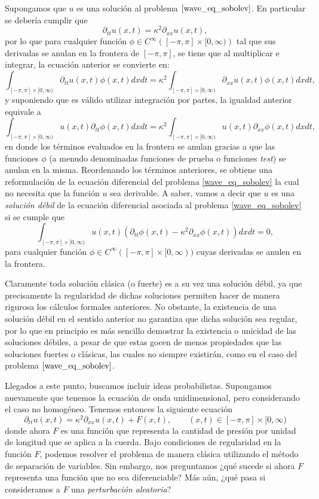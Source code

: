 \documentclass[letterpaper,twoside,12pt]{book}
\newcommand{\1}{\mathds{1}}
\theoremstyle{definition}
\theoremstyle{definition}
\theoremstyle{remark}
\theoremstyle{definition}
\theoremstyle{definition}
\theoremstyle{definition}
\theoremstyle{definition}
\theoremstyle{definition}
\begin{document}
Supongamos que $u$ es una solución al problema $\eqref{wave_eq_sobolev}$. En particular se debería cumplir que 
\[
\partial_{tt}u(x,t)=\kappa^2\partial_{xx}u(x,t),
\]
por lo que para cualquier función $\phi\in C^{\infty}\left([-\pi,\pi]\times [0,\infty)\right)$ tal que sus derivadas se anulan en la frontera de $[-\pi, \pi]$, se tiene que al multiplicar e integrar, la ecuación anterior se convierte en:
\[
    \int_{[-\pi,\pi]\times [0,\infty)}\partial_{tt}u(x,t)\phi(x,t)dx dt=\kappa^2\int_{[-\pi,\pi]\times [0,\infty)}\partial_{xx}u(x,t)\phi(x,t)dx dt,
\]
y suponiendo que es válido utilizar integración por partes, la igualdad anterior equivale a
\[
\int_{[-\pi,\pi]\times [0,\infty)}u(x,t)\partial_{tt}\phi(x,t)dx dt=\kappa^2\int_{[-\pi,\pi]\times [0,\infty)}u(x,t)\partial_{xx}\phi(x,t)dx dt,
\]
en donde los términos evaluados en la frontera se anulan gracias a que las funciones $\phi$ (a menudo denominadas funciones de prueba o funciones \textit{test}) se anulan en la misma. Reordenando los términos anteriores, se obtiene una reformulación de la ecuación diferencial del problema \eqref{wave_eq_sobolev} la cual no necesita que la función $u$ sea derivable. A saber, vamos a decir que $u$ es una \textit{solución débil} de la ecuación diferencial asociada al problema \eqref{wave_eq_sobolev} si se cumple que 
\[
\int_{[-\pi,\pi]\times [0,\infty)}u(x,t)(\partial_{tt}\phi(x,t)-\kappa^2\partial_{xx}\phi(x,t))dx dt=0,    
\]
para cualquier función $\phi\in C^{\infty}([-\pi,\pi]\times [0,\infty))$ cuyas derivadas se anulen en la frontera.

Claramente toda solución clásica (o fuerte) es a su vez una solución débil, ya que precisamente la regularidad de dichas soluciones permiten hacer de manera rigurosa los cálculos formales anteriores. No obstante, la existencia de una solución débil en el sentido anterior no garantiza que dicha solución sea regular, por lo que en principio es más sencillo demostrar la existencia o unicidad de las soluciones débiles, a pesar de que estas gocen de menos propiedades que las soluciones fuertes o clásicas, las cuales no siempre existirán, como en el caso del problema $\eqref{wave_eq_sobolev}$.

Llegados a este punto, buscamos incluir ideas probabilistas. Supongamos nuevamente que tenemos la ecuación de onda unidimensional, pero considerando el caso no homogéneo. Tenemos entonces la siguiente ecuación
\begin{equation}\label{wave_spde}
\partial_{tt}u(x,t)=\kappa^2\partial_{xx}u(x,t)+F(x,t), \qquad (x,t)\in [-\pi,\pi]\times[0,\infty)
\end{equation}
donde ahora $F$ es una función que representa la cantidad de presión por unidad de longitud que se aplica a la cuerda. Bajo condiciones de regularidad en la función $F$, podemos resolver el problema de manera clásica utilizando el método de separación de variables. Sin embargo, nos preguntamos ¿qué sucede si ahora $F$ representa una función que no sea diferenciable? Más aún, ¿qué pasa si consideramos a $F$ una \textit{perturbación aleatoria}?
\end{document}
